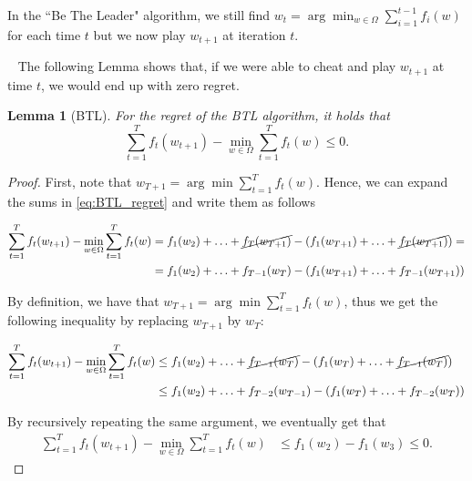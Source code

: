 \documentclass[11pt]{article}
\newtheorem{lemma}[theorem]{Lemma}
\begin{document}
\noindent In the ``Be The Leader" algorithm, we still find 
$w_t = \arg \min_{w \in \Omega} \sum_{i=1}^{t-1} f_i (w)$ for each time $t$ but we now play $w_{t+1}$ at iteration $t$.

~\newline
The following Lemma shows that, if we were able to cheat and play $w_{t+1}$ at time $t$, we would end up with zero regret.

\begin{lemma}[BTL]
For the regret of the BTL algorithm, it holds that
\label{lemma:BTL}
\begin{equation}
    \label{eq:BTL_regret}
    \sum_{t=1}^T f_t (w_{t+1}) - \min_{w \in \Omega} \sum_{t=1}^T f_t (w) \leq 0.
\end{equation}
\end{lemma}

\begin{proof}
First, note that $w_{T+1} = \arg \min \sum_{t=1}^T f_t (w)$. 
Hence, we can expand the sums in \eqref{eq:BTL_regret} and write them as follows

\begin{equation*}
\begin{split}
     \sum_{t=1}^T f_t (w_{t+1}) - \min_{w \in \Omega} \sum_{t=1}^T f_t (w) &= 
    f_1(w_2) + \ldots + \cancel{f_T (w_{T+1})} - (f_1(w_{T+1}) + \ldots + \cancel{f_{T}(w_{T+1})}) =\\&=  f_1(w_2) + \ldots + f_{T-1} (w_{T}) - (f_1(w_{T+1}) + \ldots + f_{T-1}(w_{T+1}))
\end{split}
\end{equation*}

By definition, we have that $w_{T+1} = \arg \min \sum_{t=1}^T f_t (w)$, thus we get the following inequality by replacing $w_{T+1}$ by $w_T$:

\begin{equation*}
\begin{split}
     \sum_{t=1}^T f_t (w_{t+1}) - \min_{w \in \Omega} \sum_{t=1}^T f_t (w) &\leq 
      f_1(w_2) + \ldots + \cancel{f_{T-1} (w_{T})} - (f_1(w_{T}) + \ldots + \cancel{f_{T-1}(w_{T})})
      \\&\leq f_1(w_2) + \ldots + f_{T-2} (w_{T-1}) - (f_1(w_{T}) + \ldots + f_{T-2}(w_{T}))
\end{split}
\end{equation*}

\noindent By recursively repeating the same argument, we eventually get that
\begin{equation*}
\begin{split}
     \sum_{t=1}^T f_t (w_{t+1}) - \min_{w \in \Omega} \sum_{t=1}^T f_t (w) &\leq 
      f_1(w_2) - f_1(w_3) \leq 0.
\end{split}
\end{equation*}
\end{proof}
\end{document}
